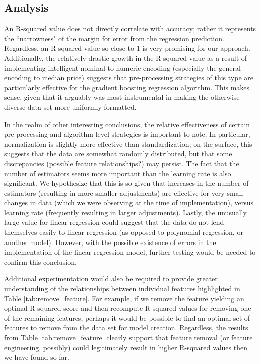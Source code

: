 \documentclass[letterpaper]{article}
\begin{document}
\subsection{Analysis}

An R-squared value does not directly correlate with accuracy; rather it represents the ``narrowness" of the margin for error from the regression prediction.  Regardless, an R-squared value so close to 1 is very promising for our approach.  Additionally, the relatively drastic growth in the R-squared value as a result of implementing intelligent nominal-to-numeric encoding (especially the general encoding to median price) suggests that pre-processing strategies of this type are particularly effective for the gradient boosting regression algorithm.  This makes sense, given that it arguably was most instrumental in making the otherwise diverse data set more uniformly formatted.

In the realm of other interesting conclusions, the relative effectiveness of certain pre-processing and algorithm-level strategies is important to note.  In particular, normalization is slightly more effective than standardization; on the surface, this suggests that the data are somewhat randomly distributed, but that some discrepancies (possible feature relationships?) may persist.  The fact that the number of estimators seems more important than the learning rate is also significant.  We hypothesize that this is so given that increases in the number of estimators (resulting in more smaller adjustments) are effective for very small changes in data (which we were observing at the time of implementation), versus learning rate (frequently resulting in larger adjustments).  Lastly, the unusually large value for linear regression could suggest that the data do not lend themselves easily to linear regression (as opposed to polynomial regression, or another model).  However, with the possible existence of errors in the implementation of the linear regression model, further testing would be needed to confirm this conclusion.

Additional experimentation would also be required to provide greater understanding of the relationships between individual features highlighted in Table \ref{tab:remove_feature}.  For example, if we remove the feature yielding an optimal R-squared score and then recompute R-squared values for removing one of the remaining features, perhaps it would be possible to find an optimal set of features to remove from the data set for model creation.  Regardless, the results from Table \ref{tab:remove_feature} clearly support that feature removal (or feature engineering, possibly) could legitimately result in higher R-squared values then we have found so far.
\end{document}
